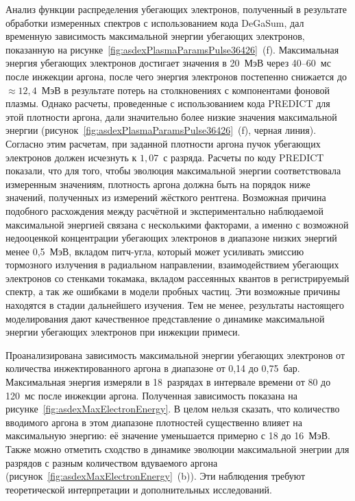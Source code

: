 Анализ функции распределения убегающих электронов, полученный в результате обработки измеренных спектров с использованием кода DeGaSum, дал временную зависимость максимальной энергии убегающих электронов, показанную на рисунке~\ref{fig:asdexPlasmaParamsPulse36426}~(f). Максимальная энергия убегающих электронов достигает значения в 20~МэВ через 40--60~мс после инжекции аргона, после чего энергия электронов постепенно снижается до $\approx{12,4}$~МэВ в результате потерь на столкновениях с компонентами фоновой плазмы. Однако расчеты, проведенные с использованием кода PREDICT для этой плотности аргона, дали значительно более низкие значения максимальной энергии (рисунок~\ref{fig:asdexPlasmaParamsPulse36426}~(f), черная линия). Согласно этим расчетам, при заданной плотности аргона пучок убегающих электронов должен исчезнуть к $1,07$~с разряда. Расчеты по коду PREDICT показали, что для того, чтобы эволюция максимальной энергии соответствовала измеренным значениям, плотность аргона должна быть на порядок ниже значений, полученных из измерений жёсткого рентгена. Возможная причина подобного расхождения между расчётной и экспериментально наблюдаемой максимальной энергией связана с несколькими факторами, а именно с возможной недооценкой концентрации убегающих электронов в диапазоне низких энергий менее 0,5~МэВ, вкладом питч-угла, который может усиливать эмиссию тормозного излучения в радиальном направлении, взаимодействием убегающих электронов со стенками токамака, вкладом рассеянных квантов в регистрируемый спектр, а так же ошибками в модели пробных частиц. Эти возможные причины находятся в стадии дальнейшего изучения. Тем не менее, результаты настоящего моделирования дают качественное представление о динамике максимальной энергии убегающих электронов при инжекции примеси.

Проанализирована зависимость максимальной энергии убегающих электронов от количества инжектированного аргона в диапазоне от 0,14 до 0,75~бар. Максимальная энергия измеряли в 18~разрядах в интервале времени от 80 до 120~мс после инжекции аргона. Полученная зависимость показана на рисунке~\ref{fig:asdexMaxElectronEnergy}. В целом нельзя сказать, что количество вводимого аргона в этом диапазоне плотностей существенно влияет на максимальную энергию: её значение уменьшается примерно с 18 до 16~МэВ. Также можно отметить сходство в динамике эволюции максимальной энегрии для разрядов с разным количеством вдуваемого аргона (рисунок~\ref{fig:asdexMaxElectronEnergy}~(b)). Эти наблюдения требуют теоретической интерпретации и дополнительных исследований.


